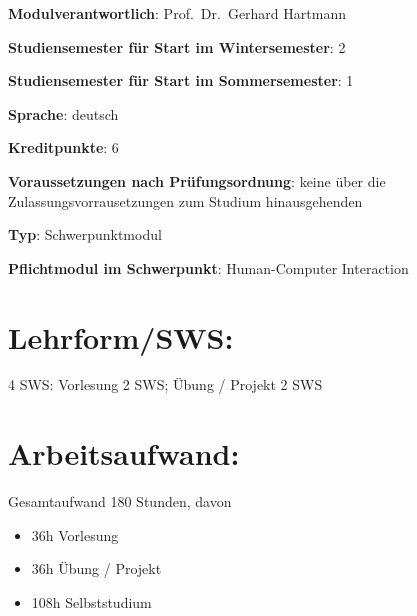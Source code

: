 \begin{modulHead}
\textbf{Modulverantwortlich}: Prof.~Dr.~Gerhard
Hartmann
\end{modulHead}
\begin{modulHead}
\textbf{Studiensemester für
Start im Wintersemester}:
2
\end{modulHead}
\begin{modulHead}
\textbf{Studiensemester für Start
im Sommersemester}:
1
\end{modulHead}
\begin{modulHead}
\textbf{Sprache}:
deutsch
\end{modulHead}
\begin{modulHead}
\textbf{Kreditpunkte}:
6
\end{modulHead}
\begin{modulHead}
\textbf{Voraussetzungen nach
Prüfungsordnung}: keine über die Zulassungsvorrausetzungen zum Studium
hinausgehenden
\end{modulHead}
\begin{modulHead}
\textbf{Typ}:
Schwerpunktmodul
\end{modulHead}
\begin{modulHead}
\textbf{Pflichtmodul
im Schwerpunkt}: Human-Computer Interaction
\end{modulHead}


\section*{Lehrform/SWS:\label{/mi-2017/modulbeschreibungen-master/MA_HCI_Modul_Statistical_Methods_for_HCI}}\label{lehrformswspathlabelmi-2017modulbeschreibungen-mastermaux5fhciux5fmodulux5fstatisticalux5fmethodsux5fforux5fhci}

4 SWS: Vorlesung 2 SWS; Übung / Projekt 2 SWS

\section*{Arbeitsaufwand:\label{/mi-2017/modulbeschreibungen-master/MA_HCI_Modul_Statistical_Methods_for_HCI}}\label{arbeitsaufwandpathlabelmi-2017modulbeschreibungen-mastermaux5fhciux5fmodulux5fstatisticalux5fmethodsux5fforux5fhci}

Gesamtaufwand 180 Stunden, davon

\begin{itemize}
\tightlist
\item
  36h Vorlesung
\item
  36h Übung / Projekt
\item
  108h Selbststudium
\end{itemize}


